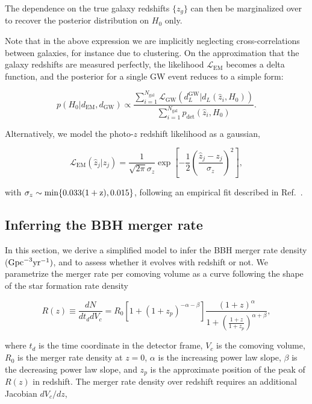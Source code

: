 \documentclass[%
preprint,
nofootinbib,
 amsmath,amssymb,
 aps,
]{revtex4-2}
\newcommand{\given}[2]{p( #1 | #2 )}
\newcommand{\pdet}[0]{p_{\text{det}}}
\begin{document}
The dependence on the true galaxy redshifts $\{z_g\}$ can then be marginalized over to recover the
posterior distribution on $H_0$ only.

Note that in the above expression we are implicitly neglecting cross-correlations between galaxies,
for instance due to clustering. On the approximation that the galaxy redshifts are measured
perfectly, the likelihood $\mathcal{L}_\text{EM}$ becomes a delta function, and the posterior for a
single GW event reduces to a simple form:

\begin{equation}
	\label{eq:stat:perfect-redshift-posterior}
	\given{H_0}{d_\text{EM}, d_\text{GW}} \propto
	\frac{\sum_{i=1}^{N_\text{gal}} \mathcal{L}_\text{GW}(d^\text{GW}_L | d_L(\hat{z}_i, H_0))}{\sum_{i=1}^{N_\text{gal}} \pdet(\hat{z}_i, H_0)}.
\end{equation}

Alternatively, we model the photo-$z$ redshift likelihood as a gaussian,

\begin{equation}
	\label{eq:stat:photo-z-likelihood}
	\mathcal{L}_\text{EM}(\hat{z}_j | z_j) = \frac{1}{\sqrt{2 \pi} \sigma_z} \exp{\left [-\frac{1}{2} \left (\frac{\hat{z}_j - z_j}{\sigma_z} \right )^2 \right ]},
\end{equation}

with $\sigma_z \sim \rm{min}\{0.033(1+z), 0.015\}$, following an empirical fit described in
Ref.~.

\subsection{Inferring the BBH merger rate}

In this section, we derive a simplified model to infer the BBH merger rate density ($\rm{Gpc}^{-3}
	\rm{yr}^{-1})$, and to assess whether it evolves with redshift or not. We parametrize the merger
rate per comoving volume as a curve following the shape of the star formation rate
density~\cite{Madau:2014bja}

\begin{equation}
	R(z) \equiv \frac{dN}{dt_d dV_c} = R_0 [1 + (1 + z_p)^{-\alpha -\beta}]\frac{(1 + z)^{\alpha}}{1 + \left ( \frac{1 + z}{1 + z_p} \right)^{\alpha + \beta}},
\end{equation}

where $t_d$ is the time coordinate in the detector frame, $V_c$ is the comoving volume, $R_0$ is
the merger rate density at $z=0$, $\alpha$ is the increasing power law slope, $\beta$ is the
decreasing power law slope, and $z_p$ is the approximate position of the peak of $R(z)$ in
redshift. The merger rate density over redshift requires an additional Jacobian $dV_c/dz$,
\end{document}

